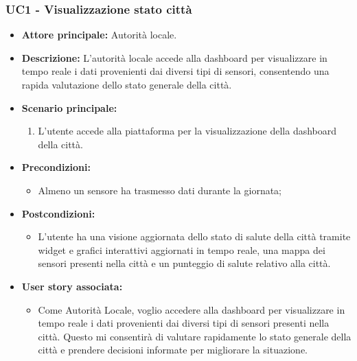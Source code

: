 \subsubsection{UC1 - Visualizzazione stato città}
\begin{itemize}
    \item \textbf{Attore principale:} Autorità locale.
    \item \textbf{Descrizione:} L'autorità locale accede alla dashboard per visualizzare in tempo reale i dati provenienti dai diversi tipi di sensori, consentendo una rapida valutazione dello stato generale della città.
    \item \textbf{Scenario principale:}
          \begin{enumerate}
              \item L'utente accede alla piattaforma per la visualizzazione della dashboard della città.
          \end{enumerate}
    \item \textbf{Precondizioni:}
          \begin{itemize}
              \item Almeno un sensore ha trasmesso dati durante la giornata;
          \end{itemize}
    \item \textbf{Postcondizioni:}
          \begin{itemize}
              \item      L'utente ha una visione aggiornata dello stato di salute della città tramite widget e grafici interattivi aggiornati in tempo reale, una mappa dei sensori presenti nella città e un punteggio di salute relativo alla città.
          \end{itemize}
    \item \textbf{User story associata:}
          \begin{itemize}
              \item Come Autorità Locale, voglio accedere alla dashboard per visualizzare in tempo reale i dati provenienti dai diversi tipi di sensori presenti nella città. Questo mi consentirà di valutare rapidamente lo stato generale della città e prendere decisioni informate per migliorare la situazione.
          \end{itemize}
\end{itemize}